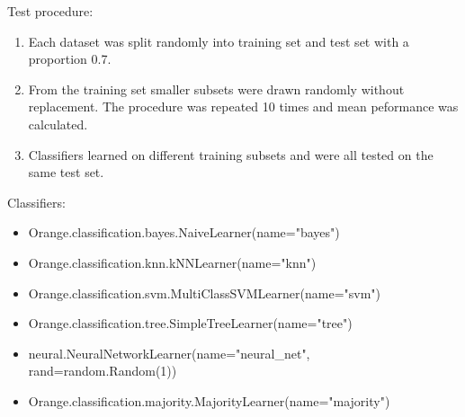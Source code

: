 \documentclass[a4paper]{article}
\begin{document}
Test procedure:
\begin{enumerate}
\item Each dataset was split randomly into training set and test set with a proportion 0.7.
\item From the training set smaller subsets were drawn randomly without replacement. The
procedure was repeated 10 times and mean peformance was calculated.
\item Classifiers learned on different training subsets and were all tested on the same test set.
\end{enumerate}

Classifiers:
\begin{itemize}
\item Orange.classification.bayes.NaiveLearner(name="bayes")
\item Orange.classification.knn.kNNLearner(name="knn")
\item Orange.classification.svm.MultiClassSVMLearner(name="svm")
\item Orange.classification.tree.SimpleTreeLearner(name="tree")
\item neural.NeuralNetworkLearner(name="neural\_net", rand=random.Random(1))
\item Orange.classification.majority.MajorityLearner(name="majority")
\end{itemize}
\end{document}
